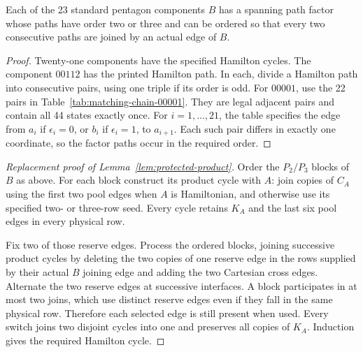 
\begin{lemma}\label{lem:pentagon-ordered-blocks}
Each of the 23 standard pentagon components $B$ has a spanning path
factor whose paths have order two or three and can be ordered so that
every two consecutive paths are joined by an actual edge of $B$.
\end{lemma}
\begin{proof}
Twenty-one components have the specified Hamilton cycles. The component
$00112$ has the printed Hamilton path. In each, divide a Hamilton path
into consecutive pairs, using one triple if its order is odd.
For $00001$, use the 22 pairs in Table~\ref{tab:matching-chain-00001}.
They are legal adjacent pairs and contain all 44 states exactly once.
For $i=1,\ldots,21$, the table specifies the edge from $a_i$ if
$\epsilon_i=0$, or $b_i$ if $\epsilon_i=1$, to $a_{i+1}$.
Each such pair differs in exactly one coordinate, so the factor paths
occur in the required order.
\end{proof}

\begin{proof}[Replacement proof of Lemma~\ref{lem:protected-product}]
Order the $P_2/P_3$ blocks of $B$ as above. For each block construct its
product cycle with $A$: join copies of $C_A$ using the first two pool
edges when $A$ is Hamiltonian, and otherwise use its specified two- or
three-row seed. Every cycle retains $K_A$ and the last six pool edges
in every physical row.

Fix two of those reserve edges. Process the ordered blocks, joining
successive product cycles by deleting the two copies of one reserve
edge in the rows supplied by their actual $B$ joining edge and adding
the two Cartesian cross edges. Alternate the two reserve edges at
successive interfaces. A block participates in at most two joins,
which use distinct reserve edges even if they fall in the same physical
row. Therefore each selected edge is still present when used.
Every switch joins two disjoint cycles into one and preserves all
copies of $K_A$. Induction gives the required Hamilton cycle.
\end{proof}


